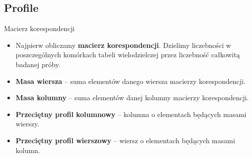\documentclass{beamer}
\begin{document}
\subsection{Profile}
\begin{frame}{Macierz korespondencji}
  \begin{itemize}
  \item Najpierw obliczamy \textbf{macierz korespondencji}. Dzielimy liczebności w poszczególnych komórkach tabeli wielodzielczej przez liczebność całkowitą badanej próby.
  \item \textbf{Masa wiersza} -- suma elementów danego wiersza macierzy korespondencji.
  \item \textbf{Masa kolumny} -- suma elementów danej kolumny macierzy korespondencji.
  \item \textbf{Przeciętny profil kolumnowy}  -- kolumna o elementach będących masami wierszy.
  \item \textbf{Przeciętny profil wierszowy} -- wiersz o elementach będących masami kolumn.
  \end{itemize}
\end{frame}
\end{document}
